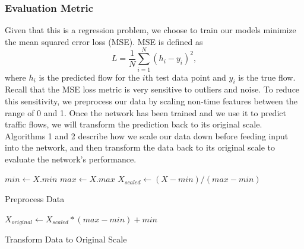 \documentclass{article}
\begin{document}
\subsubsection{Evaluation Metric}
Given that this is a regression problem, we choose to train our models minimize the mean squared error loss (MSE). MSE is defined as 
\begin{equation}
L = \frac{1}{N}\sum_{i=1}^{N}{(h_{i}-y_{i})^{2}}, 
\end{equation}
where $h_{i}$ is the predicted flow for the $i$th test data point and $y_{i}$ is the true flow. Recall that the MSE loss metric is very sensitive to outliers and noise. To reduce this sensitivity, we preprocess our data by scaling non-time features between the range of 0 and 1. Once the network has been trained and we use it to predict traffic flows, we will transform the prediction back to its original scale. Algorithms 1 and 2 describe how we scale our data down before feeding input into the network, and then transform the data back to its original scale to evaluate the network's performance.
\begin{algorithm}
  $min \gets X.min$\;
  $max \gets X.max$\;
  $X_{scaled} \gets (X - min)/(max - min)$\;
  \;
  \caption{Preprocess Data}
\end{algorithm}
\begin{algorithm}
  $X_{original} \gets X_{scaled}*(max-min) + min$\;
  \;
  \caption{Transform Data to Original Scale}
\end{algorithm}

\end{document}
